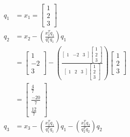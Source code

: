\documentclass{article}
\begin{document}
\begin{align}
    q_1 &= x_1=\begin{bmatrix} 1 \\ 2 \\ 3 \end{bmatrix}\\
    q_2 &= x_2 - \left( \frac{x_2^T q_1}{q_1^T q_1} \right) q_1 \\
        &= \begin{bmatrix} 1 \\ -2 \\ 3 \end{bmatrix}-\left( \frac{\begin{bmatrix} 1 & -2 & 3 \end{bmatrix}\begin{bmatrix} 1 \\ 2 \\ 3 \end{bmatrix}}{\begin{bmatrix} 1 & 2 & 3 \end{bmatrix}\begin{bmatrix} 1 \\ 2 \\ 3 \end{bmatrix}} \right)\begin{bmatrix} 1 \\ 2 \\ 3 \end{bmatrix}\\
        &= \begin{bmatrix} \frac{4}{7} \\ \frac{-20}{7} \\ \frac{12}{7} \end{bmatrix} \\
    q_3 &= x_3 - \left( \frac{x_3^T q_1}{q_1^T q_1} \right) q_1 - \left( \frac{x_3^T q_2}{q_2^T q_2} \right) q_2 \\

\end{align}
\end{document}
